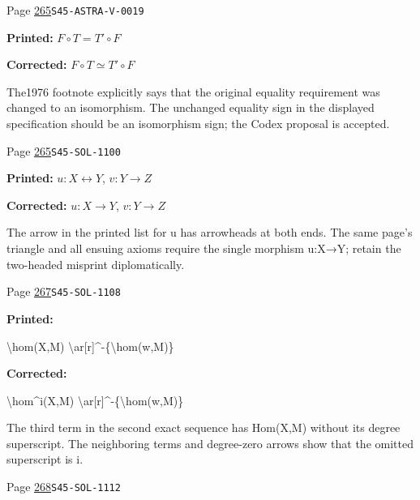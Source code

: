 \begin{description}
\smallskip
\item[\hypertarget{apparatus:EN-0189}{189}] Page \hyperlink{printpage:en:265}{265}\quad\texttt{S45-ASTRA-V-0019}
\par\noindent\textbf{Printed:} \(F\circ T = T'\circ F\)
\par\noindent\textbf{Corrected:} \(F\circ T \simeq T'\circ F\)
\par\noindent The1976 footnote explicitly says that the original equality requirement was changed to an isomorphism. The unchanged equality sign in the displayed specification should be an isomorphism sign; the Codex proposal is accepted.
\smallskip
\item[\hypertarget{apparatus:EN-0190}{190}] Page \hyperlink{printpage:en:265}{265}\quad\texttt{S45-SOL-1100}
\par\noindent\textbf{Printed:} $u:X\leftrightarrow Y$, $v:Y\to Z$
\par\noindent\textbf{Corrected:} $u:X\to Y$, $v:Y\to Z$
\par\noindent The arrow in the printed list for u has arrowheads at both ends. The same page’s triangle and all ensuing axioms require the single morphism u:X→Y; retain the two-headed misprint diplomatically.
\smallskip
\item[\hypertarget{apparatus:EN-0191}{191}] Page \hyperlink{printpage:en:267}{267}\quad\texttt{S45-SOL-1108}
\par\noindent\textbf{Printed:} {\footnotesize\ttfamily\raggedright \textbackslash{}\allowbreak{}hom(\allowbreak{}X,\allowbreak{}M)\allowbreak{} \textbackslash{}\allowbreak{}ar[\allowbreak{}r]\allowbreak{}\textasciicircum{}\allowbreak{}-\allowbreak{}\{\allowbreak{}\textbackslash{}\allowbreak{}hom(\allowbreak{}w,\allowbreak{}M)\allowbreak{}\}\allowbreak{}}
\par\noindent\textbf{Corrected:} {\footnotesize\ttfamily\raggedright \textbackslash{}\allowbreak{}hom\textasciicircum{}\allowbreak{}i(\allowbreak{}X,\allowbreak{}M)\allowbreak{} \textbackslash{}\allowbreak{}ar[\allowbreak{}r]\allowbreak{}\textasciicircum{}\allowbreak{}-\allowbreak{}\{\allowbreak{}\textbackslash{}\allowbreak{}hom(\allowbreak{}w,\allowbreak{}M)\allowbreak{}\}\allowbreak{}}
\par\noindent The third term in the second exact sequence has Hom(X,M) without its degree superscript. The neighboring terms and degree-zero arrows show that the omitted superscript is i.
\smallskip
\item[\hypertarget{apparatus:EN-0192}{192}] Page \hyperlink{printpage:en:268}{268}\quad\texttt{S45-SOL-1112}

\end{description}
